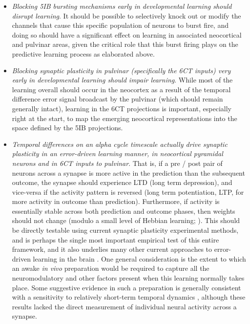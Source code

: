 \documentclass[11pt,twoside]{article}
\newif\myifpdf
\begin{document}
\begin{itemize}
	\item \emph{Blocking 5IB bursting mechanisms early in developmental learning should disrupt learning}.  It should be possible to selectively knock out or modify the channels that cause this specific population of neurons to burst fire, and doing so should have a significant effect on learning in associated neocortical and pulvinar areas, given the critical role that this burst firing plays on the predictive learning process as elaborated above.

	\item \emph{Blocking synaptic plasticity in pulvinar (specifically the 6CT inputs) very early in developmental learning should impair learning}.  While most of the learning overall should occur in the neocortex as a result of the temporal difference error signal broadcast by the pulvinar (which should remain generally intact), learning in the 6CT projections is important, especially right at the start, to map the emerging neocortical representations into the space defined by the 5IB projections.
	
	\item \emph{Temporal differences on an alpha cycle timescale actually drive synaptic plasticity in an error-driven learning manner, in neocortical pyramidal neurons and in 6CT inputs to pulvinar}.  That is, if a pre / post pair of neurons across a synapse is more active in the prediction than the subsequent outcome, the synapse should experience LTD (long term depression), and vice-versa if the activity pattern is reversed (long term potentiation, LTP, for more activity in outcome than prediction).  Furthermore, if activity is essentially stable across both prediction and outcome phases, then weights should not change (modulo a small level of Hebbian learning; \citealp{OReillyMunakata00,OReillyMunakataFrankEtAl12}).  This should be directly testable using current synaptic plasticity experimental methods, 
	 and is perhaps the single most important empirical test of this entire framework, and it also underlies many other current approaches to error-driven learning in the brain \citep{BengioMesnardFischerEtAl17,WhittingtonBogacz19,LillicrapSantoroMarrisEtAl20}.  One general consideration is the extent to which an awake \emph{in vivo} preparation would be required to capture all the neuromodulatory and other factors present when this learning normally takes place.  Some suggestive evidence in such a preparation is generally consistent with a sensitivity to relatively short-term temporal dynamics \citep{LimMcKeeWoloszynEtAl15}, although these results lacked the direct measurement of individual neural activity across a synapse.

\end{itemize}
\end{document}
